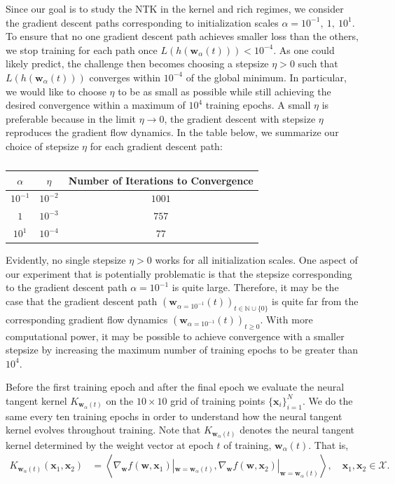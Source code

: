\documentclass{article}
\begin{document}
Since our goal is to study the NTK in the kernel and rich regimes, we consider the gradient descent paths corresponding to initialization scales $\alpha = 10^{-1}, \ 1, \ 10^{1}$. To ensure that no one gradient descent path achieves smaller loss than the others, we stop training for each path once $L(h(\boldsymbol{w}_{\alpha}(t))) < 10^{-4}$. As one could likely predict, the challenge then becomes choosing a stepsize $\eta > 0$ such that $L(h(\boldsymbol{w}_{\alpha}(t)))$ converges within $10^{-4}$ of the global minimum. In particular, we would like to choose $\eta$ to be as small as possible while still achieving the desired convergence within a maximum of $10^4$ training epochs. A small $\eta$ is preferable because in the limit $\eta \rightarrow 0$, the gradient descent with stepsize $\eta$ reproduces the gradient flow dynamics. In the table below, we summarize our choice of stepsize $\eta$ for each gradient descent path:
\begin{table}[H]
\centering
\begin{tabular}{ c|c|c } 
$\alpha$ & $\eta$ & Number of Iterations to Convergence \\
\hline
$10^{-1}$ & $10^{-2}$ & $1001$ \\ 
$1$ & $10^{-3}$ & $757$ \\
$10^1$ & $10^{-4}$ & $77$
\end{tabular}
\caption{}\label{table:NTK}
\end{table}
Evidently, no single stepsize $\eta > 0$ works for all initialization scales. One aspect of our experiment that is potentially problematic is that the stepsize corresponding to the gradient descent path $\alpha = 10^{-1}$ is quite large. Therefore, it may be the case that the gradient descent path $(\boldsymbol{w}_{\alpha = 10^{-1}}(t))_{t \in \mathbb{N} \cup \{ 0 \}}$ is quite far from the corresponding gradient flow dynamics $(\boldsymbol{w}_{\alpha = 10^{-1}}(t))_{t\geq 0}$. With more computational power, it may be possible to achieve convergence with a smaller stepsize by increasing the maximum number of training epochs to be greater than $10^4$.

Before the first training epoch and after the final epoch we evaluate the neural tangent kernel $K_{\boldsymbol{w}_{\alpha}(t)}$ on the $10 \times 10$ grid of training points $\{ \boldsymbol{x}_i \}_{i=1}^N$. We do the same every ten training epochs in order to understand how the neural tangent kernel evolves throughout training. Note that $K_{\boldsymbol{w}_{\alpha}(t)}$ denotes the neural tangent kernel determined by the weight vector at epoch $t$ of training, $\boldsymbol{w}_{\alpha}(t)$. That is, 
\begin{align*}
    K_{\boldsymbol{w}_{\alpha}(t)}(\boldsymbol{x}_1, \boldsymbol{x}_2) &= \left\langle \nabla_{\boldsymbol{w}}f(\boldsymbol{w}, \boldsymbol{x}_1)|_{\boldsymbol{w} = \boldsymbol{w}_{\alpha}(t)}, \nabla_{\boldsymbol{w}}f(\boldsymbol{w}, \boldsymbol{x}_2)|_{\boldsymbol{w} = \boldsymbol{w}_{\alpha}(t)} \right\rangle, \quad \boldsymbol{x}_1, \boldsymbol{x}_2 \in \mathcal{X}.
\end{align*}
\end{document}
